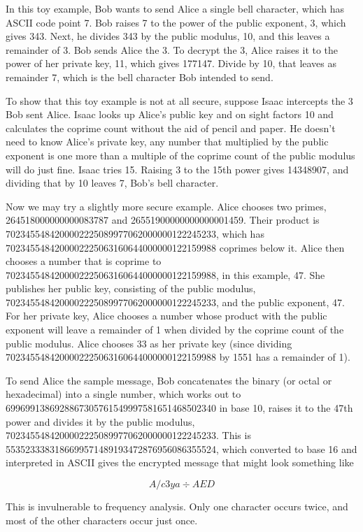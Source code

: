 \documentclass[12pt]{article}
\begin{document}
In this toy example, Bob wants to send Alice a single bell character, which has ASCII code point 7. Bob raises 7 to the power of the public exponent, 3, which gives 343. Next, he divides 343 by the public modulus, 10, and this leaves a remainder of 3. Bob sends Alice the 3. To decrypt the 3, Alice raises it to the power of her private key, 11, which gives 177147. Divide by 10, that leaves as remainder 7, which is the bell character Bob intended to send.

To show that this toy example is not at all secure, suppose Isaac intercepts the 3 Bob sent Alice. Isaac looks up Alice's public key and on sight factors 10 and calculates the coprime count without the aid of pencil and paper. He doesn't need to know Alice's private key, any number that multiplied by the public exponent is one more than a multiple of the coprime count of the public modulus will do just fine. Isaac tries 15. Raising 3 to the 15th power gives 14348907, and dividing that by 10 leaves 7, Bob's bell character.

Now we may try a slightly more secure example. Alice chooses two primes, 264518000000000083787 and 26551900000000000001459. Their product is 7023455484200002225089977062000000122245233, which has 7023455484200002225063160644000000122159988 coprimes below it. Alice then chooses a number that is coprime to 7023455484200002225063160644000000122159988, in this example, 47. She publishes her public key, consisting of  the public modulus, 7023455484200002225089977062000000122245233, and the public exponent, 47. For her private key, Alice chooses a number whose product with the public exponent will leave a remainder of 1 when divided by the coprime count of the public modulus. Alice chooses 33 as her private key (since dividing 7023455484200002225063160644000000122159988 by 1551 has a remainder of 1).

To send Alice the sample message, Bob concatenates the binary (or octal or hexadecimal) into a single number, which works out to 6996991386928867305761549997581651468502340 in base 10, raises it to the 47th power and divides it by the public modulus,  7023455484200002225089977062000000122245233. This is 5535233383186699571489193472876956086355524, which converted to base 16 and interpreted in ASCII gives the encrypted message that might look something like

$$A/c3ya{\div} AED$$

This is invulnerable to frequency analysis. Only one character occurs twice, and most of the other characters occur just once.
\end{document}
